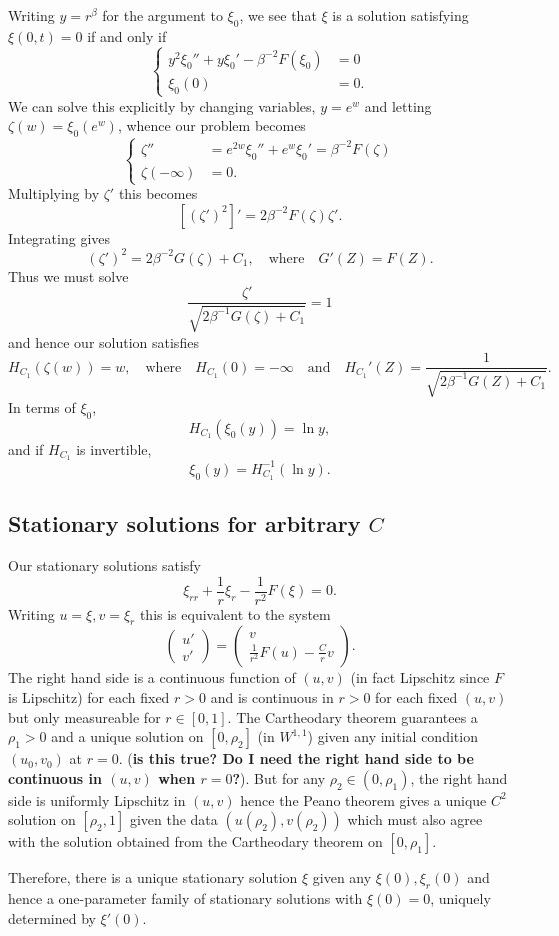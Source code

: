 \documentclass{amsart}
\begin{document}
Writing \(y = r^{\beta}\) for the argument to \(\xi_0\), we see that \(\xi\) is a solution satisfying \(\xi(0, t) = 0\) if and only if
\[
\begin{cases}
y^2 \xi_0'' + y \xi_0' - \beta^{-2} F(\xi_0) &= 0 \\
\xi_0(0) &= 0.
\end{cases}
\]
We can solve this explicitly by changing variables, \(y = e^w\) and letting \(\zeta(w) = \xi_0(e^w)\), whence our problem becomes
\[
\begin{cases}
\zeta'' &= e^{2w} \xi_0'' + e^w \xi_0' = \beta^{-2} F(\zeta) \\
\zeta(-\infty) &= 0.
\end{cases}
\]
Multiplying by \(\zeta'\) this becomes
\[
[(\zeta')^2]' = 2 \beta^{-2} F(\zeta) \zeta'.
\]
Integrating gives
\[
(\zeta')^2 = 2\beta^{-2} G(\zeta) + C_1, \quad \text{where} \quad G'(Z) = F(Z).
\]
Thus we must solve
\[
\frac{\zeta'}{\sqrt{2\beta^{-1} G(\zeta) + C_1}} = 1
\]
and hence our solution satisfies
\[
H_{C_1} (\zeta(w)) = w, \quad \text{where} \quad H_{C_1} (0) = -\infty \quad \text{and} \quad H_{C_1}'(Z) = \frac{1}{\sqrt{2\beta^{-1} G(Z) + C_1}}.
\]
In terms of \(\xi_0\),
\[
H_{C_1} (\xi_0(y)) = \ln y,
\]
and if \(H_{C_1}\) is invertible,
\[
\xi_0(y) = H_{C_1}^{-1} (\ln y).
\]

\subsection*{Stationary solutions for arbitrary \(C\)}

Our stationary solutions satisfy
\[
\xi_{rr} + \frac{1}{r} \xi_r - \frac{1}{r^2} F(\xi)  = 0.
\]
Writing \(u = \xi, v = \xi_r\) this is equivalent to the system
\[
\begin{pmatrix}
u' \\
v'
\end{pmatrix}
=
\begin{pmatrix}
v \\
\frac{1}{r^2} F(u) - \frac{C}{r} v
\end{pmatrix}.
\]
The right hand side is a continuous function of \((u,v)\) (in fact Lipschitz since \(F\) is Lipschitz) for each fixed \(r > 0\) and is continuous in \(r > 0\) for each fixed \((u, v)\) but only measureable for \(r \in [0, 1]\). The Cartheodary theorem guarantees a \(\rho_1 > 0\) and a unique solution on \([0, \rho_2]\) (in \(W^{1,1}\)) given any initial condition \((u_0, v_0)\) at \(r=0\). (\textbf{is this true? Do I need the right hand side to be continuous in \((u,v)\) when \(r=0\)?}). But for any \(\rho_2 \in (0, \rho_1)\), the right hand side is uniformly Lipschitz in \((u, v)\) hence the Peano theorem gives a unique \(C^2\) solution on \([\rho_2, 1]\) given the data \((u(\rho_2), v(\rho_2))\) which must also agree with the solution obtained from the Cartheodary theorem on \([0, \rho_1]\).

Therefore, there is a unique stationary solution \(\xi\) given any \(\xi(0), \xi_r(0)\) and hence a one-parameter family of stationary solutions with \(\xi(0) = 0\), uniquely determined by \(\xi'(0)\).
\end{document}
